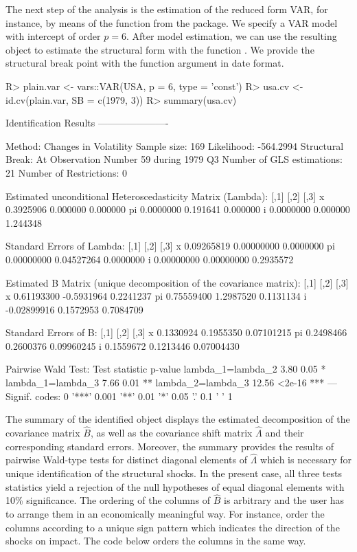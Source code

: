 \documentclass[nojss]{jss}\usepackage[]{graphicx}\usepackage[]{color}
\begin{document}
The next step of the analysis is the estimation of the reduced form VAR, for instance, by means of the function  from the  package. We specify a VAR model with intercept of order $p = 6$. After model estimation, we can use the resulting  object to estimate the structural form with the function . We provide the structural break point with the function argument  in  date format.
\begin{CodeChunk}
\begin{CodeInput}
R> plain.var <- vars::VAR(USA, p = 6, type = 'const')
R> usa.cv <- id.cv(plain.var, SB = c(1979, 3))
R> summary(usa.cv)
\end{CodeInput}
\begin{CodeOutput}
Identification Results
----------------------

Method: Changes in Volatility
Sample size: 169
Likelihood: -564.2994
Structural Break: At Observation Number 59 during 1979 Q3
Number of GLS estimations: 21
Number of Restrictions: 0

Estimated unconditional Heteroscedasticity Matrix (Lambda):
        [,1]     [,2]     [,3]
x  0.3925906 0.000000 0.000000
pi 0.0000000 0.191641 0.000000
i  0.0000000 0.000000 1.244348

Standard Errors of Lambda:
         [,1]       [,2]      [,3]
x  0.09265819 0.00000000 0.0000000
pi 0.00000000 0.04527264 0.0000000
i  0.00000000 0.00000000 0.2935572

Estimated B Matrix (unique decomposition of the covariance matrix):
          [,1]       [,2]      [,3]
x   0.61193300 -0.5931964 0.2241237
pi  0.75559400  1.2987520 0.1131134
i  -0.02899916  0.1572953 0.7084709

Standard Errors of B:
        [,1]      [,2]       [,3]
x  0.1330924 0.1955350 0.07101215
pi 0.2498466 0.2600376 0.09960245
i  0.1559672 0.1213446 0.07004430

Pairwise Wald Test:
                  Test statistic p-value
lambda_1=lambda_2           3.80    0.05 *
lambda_1=lambda_3           7.66    0.01 **
lambda_2=lambda_3          12.56  <2e-16 ***
---
Signif. codes:  0 '***' 0.001 '**' 0.01 '*' 0.05 '.' 0.1 ' ' 1
\end{CodeOutput}
\end{CodeChunk}
The summary of the identified object displays the estimated decomposition of the covariance matrix $\widehat{B}$, as well as the covariance shift matrix $\widehat{\Lambda}$ and their corresponding standard errors. Moreover, the summary provides the results of pairwise Wald-type tests for distinct diagonal elements of $\widehat{\Lambda}$ which is necessary for unique identification of the structural shocks. In the present case, all three tests statistics yield a rejection of the null hypotheses of equal diagonal elements with 10\% significance. The ordering of the columns of $\widehat{B}$ is arbitrary and the user has to arrange them in an economically meaningful way. For instance,  \cite{HerwartzPloedt2016} order the columns according to a unique sign pattern which indicates the direction of the shocks on impact. The code below orders the columns in the same way.
\end{document}
